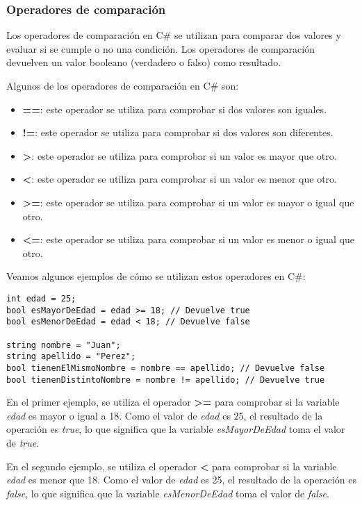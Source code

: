 \documentclass[executivepaper]{article}
\begin{document}
\subsubsection*{Operadores de comparación}

Los operadores de comparación en C\# se utilizan para comparar dos valores y evaluar si se cumple o no una condición. Los operadores de comparación devuelven un valor booleano (verdadero o falso) como resultado.

Algunos de los operadores de comparación en C\# son:

\begin{itemize}
\item \textbf{==}: este operador se utiliza para comprobar si dos valores son iguales.
\item \textbf{!=}: este operador se utiliza para comprobar si dos valores son diferentes.
\item \textbf{>}: este operador se utiliza para comprobar si un valor es mayor que otro.
\item \textbf{<}: este operador se utiliza para comprobar si un valor es menor que otro.
\item \textbf{>=}: este operador se utiliza para comprobar si un valor es mayor o igual que otro.
\item \textbf{<=}: este operador se utiliza para comprobar si un valor es menor o igual que otro.
\end{itemize}

Veamos algunos ejemplos de cómo se utilizan estos operadores en C\#:

\begin{lstlisting}
int edad = 25;
bool esMayorDeEdad = edad >= 18; // Devuelve true
bool esMenorDeEdad = edad < 18; // Devuelve false

string nombre = "Juan";
string apellido = "Perez";
bool tienenElMismoNombre = nombre == apellido; // Devuelve false
bool tienenDistintoNombre = nombre != apellido; // Devuelve true
\end{lstlisting}

En el primer ejemplo, se utiliza el operador \textbf{>=} para comprobar si la variable \textit{edad} es mayor o igual a 18. Como el valor de \textit{edad} es 25, el resultado de la operación es \textit{true}, lo que significa que la variable \textit{esMayorDeEdad} toma el valor de \textit{true}.

En el segundo ejemplo, se utiliza el operador \textbf{<} para comprobar si la variable \textit{edad} es menor que 18. Como el valor de \textit{edad} es 25, el resultado de la operación es \textit{false}, lo que significa que la variable \textit{esMenorDeEdad} toma el valor de \textit{false}.
\end{document}
